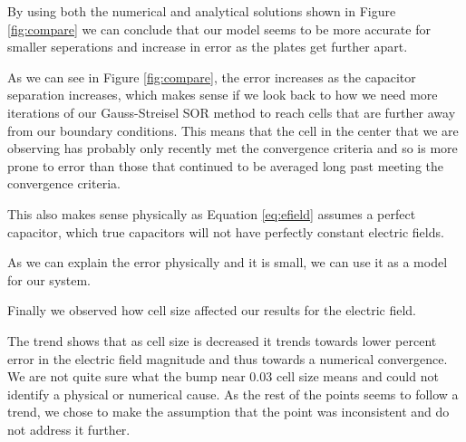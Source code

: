 \documentclass{report}
\begin{document}
            By using both the numerical and analytical solutions shown in Figure \ref{fig:compare} we can conclude that our model seems to be more accurate for smaller seperations and increase in error as the plates get further apart. 
            
            As we can see in Figure \ref{fig:compare}, the error increases as the capacitor separation increases, which makes sense if we look back to how we need more iterations of our Gauss-Streisel SOR method to reach cells that are further away from our boundary conditions. This means that the cell in the center that we are observing has probably only recently met the convergence criteria and so is more prone to error than those that continued to be averaged long past meeting the convergence criteria. 
            
            This also makes sense physically as Equation \ref{eq:efield} assumes a perfect capacitor, which true capacitors will not have perfectly constant electric fields.
            
            As we can explain the error physically and it is small, we can use it as a model for our system.
            
            Finally we observed how cell size affected our results for the electric field. 
            
            The trend shows that as cell size is decreased it trends towards lower percent error in the electric field magnitude and thus towards a numerical convergence. We are not quite sure what the bump near 0.03 cell size means and could not identify a physical or numerical cause. As the rest of the points seems to follow a trend, we chose to make the assumption that the point was inconsistent and do not address it further.
\end{document}
